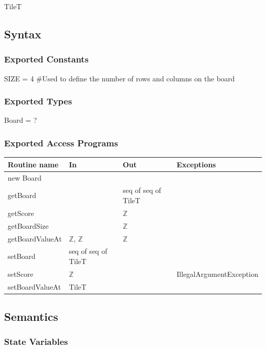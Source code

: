\documentclass[12pt]{article}
\begin{document}
TileT

\subsection* {Syntax}

\subsubsection* {Exported Constants}

SIZE = 4  \#Used to define the number of rows and columns on the board

\subsubsection* {Exported Types}

Board = ?

\subsubsection* {Exported Access Programs}

\begin{tabular}{| l | l | l | p{5cm} |}
\hline
\textbf{Routine name} & \textbf{In} & \textbf{Out} & \textbf{Exceptions}\\
\hline
new Board & & & \\
\hline
getBoard & & seq of seq of TileT & \\
\hline
getScore & & $\mathbb{Z}$ & \\
\hline
getBoardSize & & $\mathbb{Z}$ & \\
\hline
getBoardValueAt & $\mathbb{Z}$, $\mathbb{Z}$ & $\mathbb{Z}$ & \\
\hline
setBoard & seq of seq of TileT & & \\
\hline
setScore & $\mathbb{Z}$ & & IllegalArgumentException\\
\hline
setBoardValueAt & TileT & & \\
\hline
\end{tabular}

\subsection* {Semantics}

\subsubsection* {State Variables}
\end{document}
